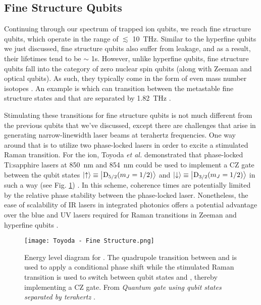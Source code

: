 \subsection{Fine Structure Qubits}
Continuing through our spectrum of trapped ion qubits, we reach fine structure qubits, which operate in the range of $\lesssim$ \SI{10}{\tera\hertz}. Similar to the hyperfine qubits we just discussed, fine structure qubits also suffer from leakage, and as a result, their lifetimes tend to be $\sim$ 1s. However, unlike hyperfine qubits, fine structure qubits fall into the category of zero nuclear spin qubits (along with Zeeman and optical qubits). As such, they typically come in the form of even mass number isotopes \cite{Bruzewicz}. An example is  which can transition between the metastable fine structure states  and  that are separated by \SI{1.82}{\tera\hertz} \cite{Toyoda}. 

Stimulating these transitions for fine structure qubits is not much different from the previous qubits that we've discussed, except there are challenges that arise in generating narrow-linewidth laser beams at terahertz frequencies. One way around that is to utilize two phase-locked lasers in order to excite a stimulated Raman transition. For the  ion, Toyoda \textit{et al.} demonstrated that phase-locked Ti:sapphire lasers at \SI{850}{\nano\meter} and \SI{854}{\nano\meter} could be used to implement a CZ gate between the qubit states $\ket{\uparrow} \equiv \ket{\text{\textsuperscript{}{{D}}\textsubscript{5/2}} (m_J = 1/2)}$ and $\ket{\downarrow} \equiv \ket{\text{\textsuperscript{}{{D}}\textsubscript{3/2}} (m_J = 1/2)}$ in such a way (see Fig. \ref{fig:Fine Structure}) \cite{Toyoda}. In this scheme, coherence times are potentially limited by the relative phase stability between the phase-locked laser. Nonetheless, the ease of scalability of IR lasers in integrated photonics offers a potential advantage over the blue and UV lasers required for Raman transitions in Zeeman and hyperfine qubits \cite{Bruzewicz}. 

\begin{figure}[t]
    \texttt{[image: Toyoda - Fine Structure.png]}
    \caption{Energy level diagram for . The quadrupole transition between  and  is used to apply a conditional phase shift while the stimulated Raman transition is used to switch between qubit states  and , thereby implementing a CZ gate. From \textit{Quantum gate using qubit states separated by terahertz} \cite{Toyoda}.}
    \label{fig:Fine Structure}
\end{figure}

